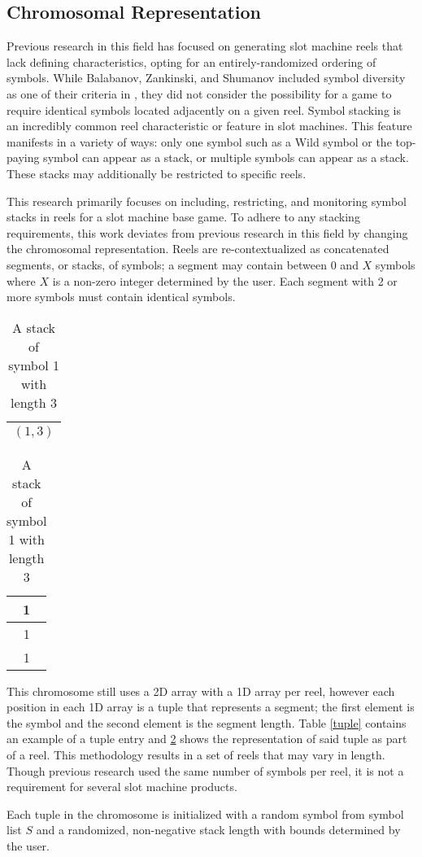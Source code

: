 \documentclass[conference]{IEEEtran}
\begin{document}
\subsection{Chromosomal Representation}
Previous research in this field has focused on generating slot machine reels that lack defining characteristics, opting for an entirely-randomized ordering of symbols.
While Balabanov, Zankinski, and Shumanov included symbol diversity as one of their criteria in \cite{balabanovDDE}, they did not consider the possibility for a game to require identical symbols located adjacently on a given reel.
Symbol stacking is an incredibly common reel characteristic or feature in slot machines.
This feature manifests in a variety of ways: only one symbol such as a Wild symbol or the top-paying symbol can appear as a stack, or multiple symbols can appear as a stack.
These stacks may additionally be restricted to specific reels.
\par
This research primarily focuses on including, restricting, and monitoring symbol stacks in reels for a slot machine base game.
To adhere to any stacking requirements, this work deviates from previous research in this field by changing the chromosomal representation.
Reels are re-contextualized as concatenated segments, or stacks, of symbols; a segment may contain between 0 and $X$ symbols where $X$ is a non-zero integer determined by the user.
Each segment with 2 or more symbols must contain identical symbols.
\begin{table}
\parbox{.45\linewidth}{
\centering
\begin{tabular}{|c|}
\hline
$(1,3)$\\
\hline
\end{tabular}
\caption{A tuple depicting a stack of symbol 1 with length 3}
\label{tuple}
}
\hfill
\parbox{.45\linewidth}{
\centering
\begin{tabular}{|c|}
\hline
1\\
\hline
1\\
\hline
1\\
\hline
\end{tabular}
\caption{A stack of symbol 1 with length 3}
\label{stack}
}
\end{table}
\par
This chromosome still uses a 2D array with a 1D array per reel, however each position in each 1D array is a tuple that represents a segment; the first element is the symbol and the second element is the segment length. Table \ref{tuple} contains an example of a tuple entry and \ref{stack} shows the representation of said tuple as part of a reel.
This methodology results in a set of reels that may vary in length.
Though previous research used the same number of symbols per reel, it is not a requirement for several slot machine products.
\par
Each tuple in the chromosome is initialized with a random symbol from symbol list $S$ and a randomized, non-negative stack length with bounds determined by the user.
\end{document}
